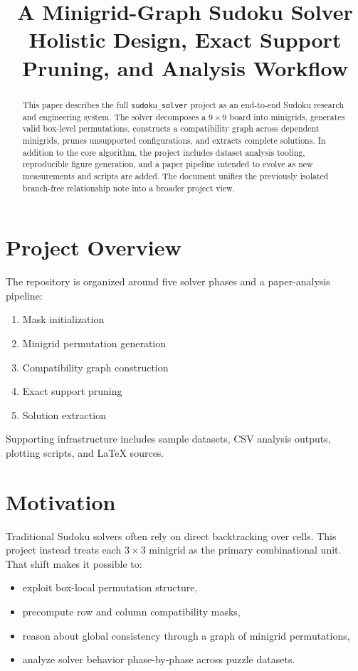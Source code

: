 \documentclass[11pt,a4paper]{article}
\title{\textbf{A Minigrid-Graph Sudoku Solver}\\
\large Holistic Design, Exact Support Pruning, and Analysis Workflow}
\author{}
\date{}
\begin{document}
\maketitle

\begin{abstract}
This paper describes the full \texttt{sudoku\_solver} project as an end-to-end Sudoku research and engineering system. The solver decomposes a $9 \times 9$ board into minigrids, generates valid box-level permutations, constructs a compatibility graph across dependent minigrids, prunes unsupported configurations, and extracts complete solutions. In addition to the core algorithm, the project includes dataset analysis tooling, reproducible figure generation, and a paper pipeline intended to evolve as new measurements and scripts are added. The document unifies the previously isolated branch-free relationship note into a broader project view.
\end{abstract}

\section{Project Overview}

The repository is organized around five solver phases and a paper-analysis pipeline:
\begin{enumerate}
    \item Mask initialization
    \item Minigrid permutation generation
    \item Compatibility graph construction
    \item Exact support pruning
    \item Solution extraction
\end{enumerate}

Supporting infrastructure includes sample datasets, CSV analysis outputs, plotting scripts, and LaTeX sources.

\section{Motivation}

Traditional Sudoku solvers often rely on direct backtracking over cells. This project instead treats each $3 \times 3$ minigrid as the primary combinational unit. That shift makes it possible to:
\begin{itemize}
    \item exploit box-local permutation structure,
    \item precompute row and column compatibility masks,
    \item reason about global consistency through a graph of minigrid permutations,
    \item analyze solver behavior phase-by-phase across puzzle datasets.
\end{itemize}
\end{document}
